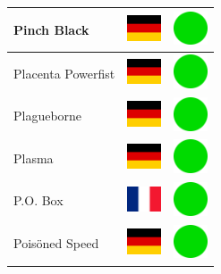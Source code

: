 \documentclass[12pt, a4paper, twoside]{report}
\begin{document}
\begin{center}
\begin{longtable}{|p{5cm}|p{2cm}|p{2cm}|}
 Pinch Black                                                & \includegraphics[width=1cm]{../4x3/de} &   \includegraphics[width=1cm]{../likes/y} \\ \hline
 Placenta Powerfist                                         & \includegraphics[width=1cm]{../4x3/de} &   \includegraphics[width=1cm]{../likes/y} \\ \hline
 Plagueborne                                                & \includegraphics[width=1cm]{../4x3/de} &   \includegraphics[width=1cm]{../likes/y} \\ \hline
 Plasma                                                     & \includegraphics[width=1cm]{../4x3/de} &   \includegraphics[width=1cm]{../likes/y} \\ \hline
 P.O. Box                                                   & \includegraphics[width=1cm]{../4x3/fr} &   \includegraphics[width=1cm]{../likes/y} \\ \hline
 Poisöned Speed                                             & \includegraphics[width=1cm]{../4x3/de} &   \includegraphics[width=1cm]{../likes/y} \\ \hline

\end{longtable}
\end{center}
\end{document}
